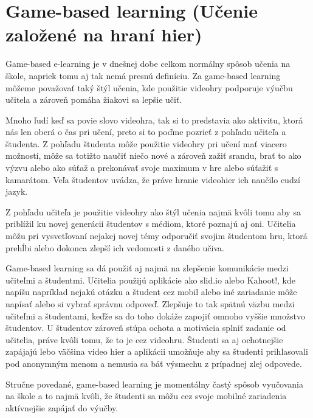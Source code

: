 \documentclass[10pt,oneside,slovak,a4paper]{article}
\begin{document}
\section{Game-based learning (Učenie založené na hraní hier)} \label{ml}

Game-based e-learning je v dnešnej dobe celkom normálny spôsob učenia na škole, napriek tomu aj tak nemá presnú definíciu. Za game-based learning môžeme považovať taký štýl učenia, kde použitie videohry podporuje výučbu učitela a zároveň pomáha žiakovi sa lepšie učiť.\cite{Perrota}
	
	Mnoho ľudí keď sa povie slovo videohra, tak si to predstavia ako aktivitu, ktorá nás len oberá o čas pri učení, preto si to poďme pozrieť z pohľadu učiteľa a študenta\cite{Perrota}. Z pohľadu študenta môže použitie videohry pri učení mať viacero možností, môže sa totižto naučiť niečo nové a zároveň zažiť srandu, brať to ako výzvu alebo ako súťaž a prekonávať svoje maximum v hre alebo súťažiť s kamarátom\cite{Perrota}. Veľa študentov uvádza, že práve hranie videohier ich naučilo cudzí jazyk. 
	
	Z pohľadu učiteľa je použitie videohry ako štýl učenia najmä kvôli tomu aby sa priblížil ku novej generácii študentov s médiom, ktoré poznajú aj oni. Učitelia môžu pri vysvetľovaní nejakej novej témy odporučiť svojim študentom hru, ktorá prehĺbi alebo dokonca zlepší ich vedomosti z daného učiva\cite{Perrota}. 
	
	Game-based learning sa dá použiť aj najmä na zlepšenie komunikácie medzi učiteľmi a študentmi. Učitelia použijú aplikácie ako slid.io alebo Kahoot!, kde napíšu napríklad nejakú otázku a študent cez mobil alebo iné zariadanie môže napísať alebo si vybrať správnu odpoveď. Zlepšuje to tak spätnú väzbu medzi učiteľmi a študentami, keďže sa do toho dokáže zapojiť omnoho vyššie množstvo študentov. U študentov zároveň stúpa ochota a motivácia splniť zadanie od učitelia, práve kvôli tomu, že to je cez videohru.\cite{Perrota} Študenti sa aj ochotnejšie zapájajú lebo väčšina video hier a aplikácii umožňuje aby sa študenti prihlasovali pod anonymným menom a nemusia sa báť výsmechu z prípadnej zlej odpovede.
	
	Stručne povedané, game-based learning je momentálny častý spôsob vyučovania na škole a to najmä kvôli, že študenti sa môžu cez svoje mobilné zariadenia aktívnejšie zapájať do výučby.
\end{document}
